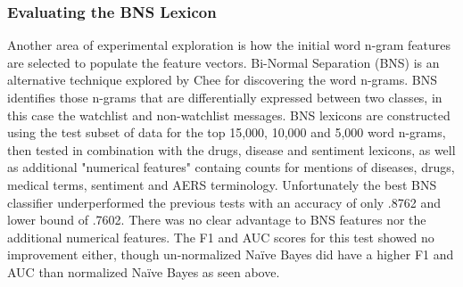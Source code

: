 \documentclass[twoside,11pt]{article}
\begin{document}
\subsubsection{Evaluating the BNS Lexicon}
Another area of experimental exploration is how the initial word n-gram features are selected to populate the feature vectors. Bi-Normal Separation (BNS) is an alternative technique explored by Chee for discovering the word n-grams. BNS identifies those n-grams that are differentially expressed between two classes, in this case the watchlist and non-watchlist messages. BNS lexicons are constructed using the test subset of data for the top 15,000, 10,000 and 5,000 word n-grams, then tested in combination with the drugs, disease and sentiment lexicons, as well as additional "numerical features" containg counts for mentions of diseases, drugs, medical terms, sentiment and AERS terminology. Unfortunately the best BNS classifier underperformed the previous tests with an accuracy of only .8762 and lower bound of .7602. There was no clear advantage to BNS features nor the additional numerical features. The F1 and AUC scores for this test showed no improvement either, though un-normalized Na\"ive Bayes did have a higher F1 and AUC than normalized Na\"ive Bayes as seen above.
\end{document}
